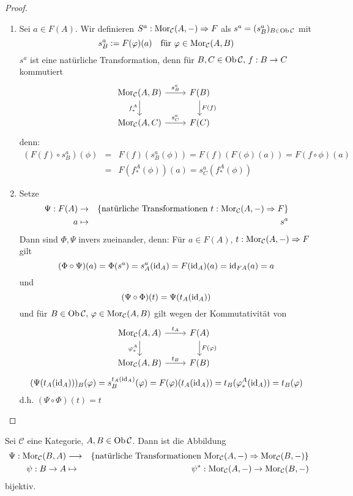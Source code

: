 \begin{proof}
	\begin{enumerate}
		\item Sei $a\in F(A)$. Wir definieren $S^a: \text{Mor}_{\mathcal{C}}(A,-) \Rightarrow F$ als $s^a= (s^a_B)_{B\in \text{Ob}\,\mathcal{C}}$ mit 
		$$s_B^a := F(\varphi)(a) \quad \text{für } \varphi \in \text{Mor}_{\mathcal{C}}(A,B)$$
		$s^a$ ist eine natürliche Transformation, denn für $B,C\in \text{Ob}\,\mathcal{C}, \, f:B \to C$ kommutiert
		$$\begin{tikzcd}
		\Mor_{\mathcal{C}}(A,B) \arrow{r}{s_B^a}\arrow[swap]{d}{f_*^A} & F(B) \arrow{d}{F(f)}\\
		\Mor_{\mathcal{C}}(A,C) \arrow{r}{s_C^a} & F(C)
		\end{tikzcd}$$
		denn:
		\begin{eqnarray*}(F(f) \circ s_B^a)(\phi) &=& F(f) (s_B^a(\phi)) = F(f)(F(\phi)(a)) = F(f\circ \phi)(a) \\
			&=& F(f_*^A(\phi))(a) = s_C^a(f_*^A(\phi))
	\end{eqnarray*}
	\item Setze \begin{eqnarray*}
	\Psi:F(A) &\to& \{\text{natürliche Transformationen }t:\text{Mor}_{\mathcal{C}}(A, -) \Rightarrow F\}\\
	a & \mapsto & s^a
	\end{eqnarray*}
	Dann sind $\Phi, \Psi$ invers zueinander, denn: Für $a\in F(A)$, $t:\text{Mor}_{\mathcal{C}}(A,-) \Rightarrow F$ gilt
	$$(\Phi \circ \Psi)(a) = \Phi(s^a) = s_A^a(\operatorname{id}_A) = F(\operatorname{id}_A)(a) = \operatorname{id}_{FA}(a) = a$$
	und 
	$$(\Psi \circ \Phi)(t) = \Psi(t_A(\operatorname{id}_A))$$
	und für $B\in \text{Ob}\,\mathcal{C}, \, \varphi \in \text{Mor}_{\mathcal{C}}(A,B)$ gilt wegen der Kommutativität von 
	$$\begin{tikzcd}
	\Mor_{\mathcal{C}}(A,A) \arrow{r}{t_A}\arrow[swap]{d}{\phi_*^A} & F(A) \arrow{d}{F(\phi)}\\
	\Mor_{\mathcal{C}}(A,B) \arrow{r}{t_B} & F(B)
	\end{tikzcd}$$
	$$(\Psi(t_A(\operatorname{id}_A)))_B(\varphi) = s^{t_A(\operatorname{id}_A)}_B(\varphi)= F(\varphi)(t_A(\operatorname{id}_A)) = t_B(\varphi_*^A(\operatorname{id}_A)) = t_B(\varphi) $$
	d.h. $(\Psi \circ \Phi)(t) = t$
	\end{enumerate}
\end{proof}
\begin{fo}
	Sei $\mathcal{C}$ eine Kategorie, $A,B \in \text{Ob}\,\mathcal{C}$. Dann ist die Abbildung 
	\begin{eqnarray*}
	 \Psi: \text{Mor}_{\mathcal{C}}(B,A) & \longrightarrow & \{\text{natürliche Transformationen } \text{Mor}_{\mathcal{C}}(A,-) \Rightarrow \text{Mor}_{\mathcal{C}}(B,-) \}\\
	 \psi:B \to A & \mapsto & \psi^*: \text{Mor}_{\mathcal{C}}(A,-) \to \text{Mor}_{\mathcal{C}}(B,-)
 	\end{eqnarray*}
 bijektiv.
\end{fo}
